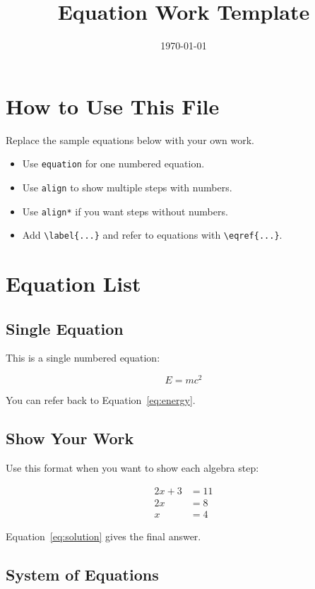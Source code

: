 \documentclass[11pt]{article}
\title{Equation Work Template}
\author{}
\date{\today}
\begin{document}
\maketitle

\section*{How to Use This File}
Replace the sample equations below with your own work.

\begin{itemize}
  \item Use \texttt{equation} for one numbered equation.
  \item Use \texttt{align} to show multiple steps with numbers.
  \item Use \texttt{align*} if you want steps without numbers.
  \item Add \verb|\label{...}| and refer to equations with \verb|\eqref{...}|.
\end{itemize}

\section{Equation List}

\subsection{Single Equation}
This is a single numbered equation:

\begin{equation}
E = mc^2
\label{eq:energy}
\end{equation}

You can refer back to Equation~\eqref{eq:energy}.

\subsection{Show Your Work}
Use this format when you want to show each algebra step:

\begin{align}
2x + 3 &= 11 \label{eq:start} \\
2x &= 8 \label{eq:subtract3} \\
x &= 4 \label{eq:solution}
\end{align}

Equation~\eqref{eq:solution} gives the final answer.

\subsection{System of Equations}
\end{document}
